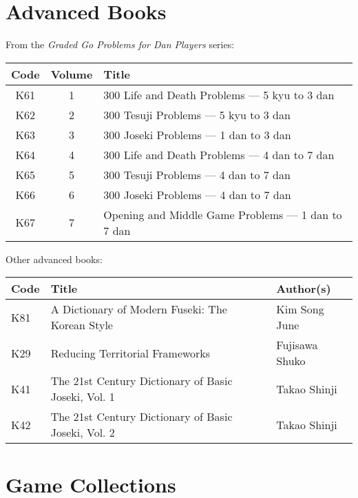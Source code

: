 \section{Advanced Books}

From the \emph{Graded Go Problems for Dan Players} series:

\begin{longtable}{c|c|p{45mm}} 
    \hline
    \textbf{Code} & \textbf{Volume} & \textbf{Title} \\
    \hline \hline
    K61 & 1 & 300 Life and Death Problems --- 5 kyu to 3 dan \\
    \hline
    K62 & 2 & 300 Tesuji Problems --- 5 kyu to 3 dan \\
    \hline
    K63 & 3 & 300 Joseki Problems --- 1 dan to 3 dan \\
    \hline
    K64 & 4 & 300 Life and Death Problems --- 4 dan to 7 dan \\
    \hline
    K65 & 5 & 300 Tesuji Problems --- 4 dan to 7 dan \\
    \hline
    K66 & 6 & 300 Joseki Problems --- 4 dan to 7 dan \\
    \hline
    K67 & 7 & Opening and Middle Game Problems --- 1 dan to 7 dan \\
    \hline
\end{longtable}

Other advanced books:

\begin{longtable}{l|p{45mm}|p{25mm}} 
    \hline
    \textbf{Code} & \textbf{Title} & \textbf{Author(s)} \\
    \hline \hline
    K81 & A Dictionary of Modern Fuseki: The Korean Style & Kim Song June \\
    \hline
    K29 & Reducing Territorial Frameworks & Fujisawa Shuko \\
    \hline
    K41 & The 21st Century Dictionary of Basic Joseki, Vol. 1 & Takao Shinji \\
    \hline
    K42 & The 21st Century Dictionary of Basic Joseki, Vol. 2 & Takao Shinji \\
    \hline
\end{longtable}

\pagebreak

\section{Game Collections}

